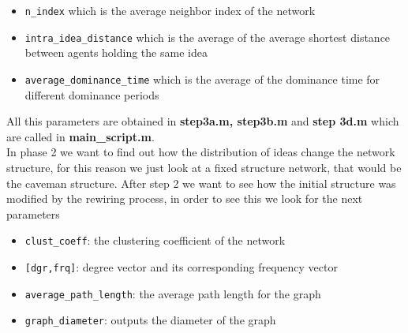 \begin{itemize}
\item \verb+n_index+ which is the average neighbor index of the network
\item \verb+intra_idea_distance+ which is the average of the average shortest distance between agents holding the same idea
\item \verb+average_dominance_time+ which is the average of the dominance time for different dominance periods
\end{itemize}

\noindent All this parameters are obtained in \textbf{step3a.m, step3b.m } and \textbf{step 3d.m} which are called in \textbf{main\_script.m}.
\\

\noindent In phase 2 we want to find out how the distribution of ideas change the network structure, for this reason we just look at a fixed structure network, that would be the caveman structure. After step 2 we want to see how the initial structure was modified by the rewiring process, in order to see this  we look for the next parameters

\begin{itemize}
\item \verb+clust_coeff+: the clustering coefficient of the network
\item  \verb+[dgr,frq]+: degree vector and its corresponding frequency vector 
\item \verb+average_path_length+: the average path length for the graph
\item \verb+graph_diameter+: outputs the diameter of the graph 

\end{itemize}








      